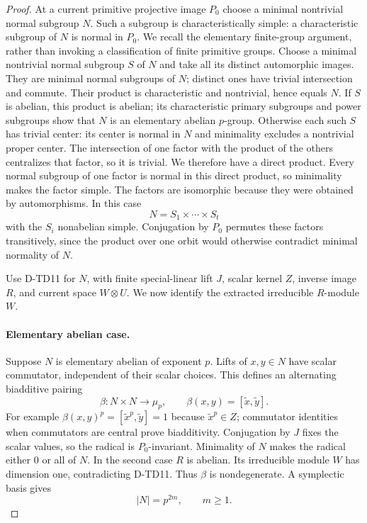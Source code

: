 \begin{proof}
At a current primitive projective image $P_0$ choose a minimal
nontrivial normal subgroup $N$.  Such a subgroup is characteristically
simple: a characteristic subgroup of $N$ is normal in $P_0$.
We recall the elementary finite-group argument, rather than invoking
a classification of finite primitive groups.  Choose a minimal
nontrivial normal subgroup $S$ of $N$ and take all its distinct
automorphic images.  They are minimal normal subgroups of $N$;
distinct ones have trivial intersection and commute.  Their product
is characteristic and nontrivial, hence equals $N$.
If $S$ is abelian, this product is abelian; its characteristic
primary subgroups and power subgroups show that $N$ is an elementary
abelian $p$-group.  Otherwise each such $S$ has trivial center:
its center is normal in $N$ and minimality excludes a nontrivial
proper center.  The intersection of one factor with the product
of the others centralizes that factor, so it is trivial.  We
therefore have a direct product.  Every normal subgroup of one
factor is normal in this direct product, so minimality makes the
factor simple.  The factors are isomorphic because they were
obtained by automorphisms.  In this case
\[
                       N=S_1\times\cdots\times S_t
 \tag{TDR.7}
\]
with the $S_i$ nonabelian simple.  Conjugation by $P_0$ permutes
these factors transitively, since the product over one orbit
would otherwise contradict minimal normality of $N$.

Use D-TD11 for $N$, with finite special-linear lift $J$, scalar
kernel $Z$, inverse image $R$, and current space $W\otimes U$.
We now identify the extracted irreducible $R$-module $W$.

\paragraph{Elementary abelian case.}
Suppose $N$ is elementary abelian of exponent $p$.  Lifts of
$x,y\in N$ have scalar commutator, independent of their scalar
choices.  This defines an alternating biadditive pairing
\[
 \beta:N\times N\longrightarrow\mu_p,\qquad
 \beta(x,y)=[\widetilde x,\widetilde y].
 \tag{TDR.8}
\]
For example $\beta(x,y)^p=[\widetilde x^p,\widetilde y]=1$
because $\widetilde x^p\in Z$; commutator identities when
commutators are central prove biadditivity.  Conjugation by $J$
fixes the scalar values, so the radical is $P_0$-invariant.
Minimality of $N$ makes the radical either $0$ or all of $N$.
In the second case $R$ is abelian.  Its irreducible module $W$
has dimension one, contradicting D-TD11.  Thus $\beta$ is
nondegenerate.  A symplectic basis gives
\[
                        |N|=p^{2m},\qquad m\ge1.
 \tag{TDR.9}
\]


\end{proof}
